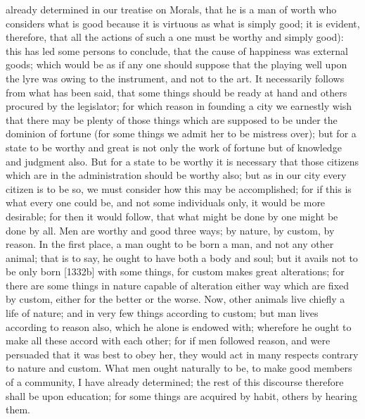 already determined in our treatise on Morals, that he is a man of worth
who considers what is good because it is virtuous as what is simply good;
it is evident, therefore, that all the actions of such a one must be
worthy and simply good): this has led some persons to conclude, that the
cause of happiness was external goods; which would be as if any one should
suppose that the playing well upon the lyre was owing to the instrument,
and not to the art. It necessarily follows from what has been said, that
some things should be ready at hand and others procured by the legislator;
for which reason in founding a city we earnestly wish that there may be
plenty of those things which are supposed to be under the dominion of
fortune (for some things we admit her to be mistress over); but for a
state to be worthy and great is not only the work of fortune but of
knowledge and judgment also. But for a state to be worthy it is necessary
that those citizens which are in the administration should be worthy also;
but as in our city every citizen is to be so, we must consider how this
may be accomplished; for if this is what every one could be, and not some
individuals only, it would be more desirable; for then it would follow,
that what might be done by one might be done by all. Men are worthy and
good three ways; by nature, by custom, by reason. In the first place, a
man ought to be born a man, and not any other animal; that is to say, he
ought to have both a body and soul; but it avails not to be only born
[1332b] with some things, for custom makes great alterations; for there
are some things in nature capable of alteration either way which are fixed
by custom, either for the better or the worse. Now, other animals live
chiefly a life of nature; and in very few things according to custom; but
man lives according to reason also, which he alone is endowed with;
wherefore he ought to make all these accord with each other; for if men
followed reason, and were persuaded that it was best to obey her, they
would act in many respects contrary to nature and custom. What men ought
naturally to be, to make good members of a community, I have already
determined; the rest of this discourse therefore shall be upon education;
for some things are acquired by habit, others by hearing them.


